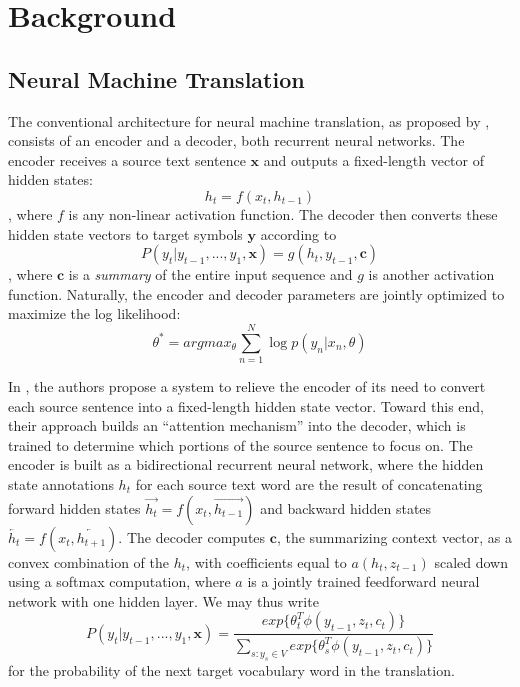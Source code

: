 \section{Background}
\label{sec:background}

\subsection{Neural Machine Translation}
The conventional architecture for neural machine translation, as proposed by ,
consists of an encoder and a decoder, both recurrent neural networks. The encoder receives
a source text sentence $\mathbf{x}$ and outputs a fixed-length vector of hidden states:
\begin{equation}
h_{t} = f(x_{t}, h_{t-1})
\end{equation},
where $f$ is any non-linear activation function. The decoder then converts these hidden state vectors to
target symbols $\mathbf{y}$ according to
\begin{equation}
P(y_{t} | y_{t-1}, ..., y_{1}, \mathbf{x}) = g(h_{t}, y_{t-1}, \mathbf{c})
\end{equation},
where $\mathbf{c}$ is a \emph{summary} of the entire input sequence and $g$ is another activation function.
Naturally, the encoder and decoder parameters are jointly optimized to maximize the log likelihood:
\begin{equation}
\theta^{*} = argmax_{\theta} \sum_{n=1}^{N}\log p(y_{n} | x_{n}, \theta)
\end{equation}

In , the authors propose a system to relieve the encoder of its need
to convert each source sentence into a fixed-length hidden state vector. Toward this end, their approach builds an ``attention mechanism''
into the decoder, which is trained to determine which portions of the source sentence to focus on. The encoder
is built as a bidirectional recurrent neural network, where the hidden state annotations $h_{t}$ for each source text word
are the result of concatenating forward hidden states $\overrightarrow{h_{t}} = f(x_{t}, \overrightarrow{h_{t-1}})$ and backward hidden states
$\overleftarrow{h_{t}} = f(x_{t}, \overleftarrow{h_{t+1}})$. The decoder computes $\mathbf{c}$, the summarizing context vector,
as a convex combination of the $h_{t}$, with coefficients equal to $a(h_{t}, z_{t-1})$ scaled down using a softmax computation, where $a$ is a
jointly trained feedforward neural network with one hidden layer. We may thus write
\begin{equation}
P(y_{t} | y_{t-1}, ..., y_{1}, \mathbf{x}) = \dfrac{exp\{\theta_{t}^{T} \phi(y_{t-1}, z_{t}, c_{t})\}}{\displaystyle\sum_{s:y_{s} \in V} exp\{\theta_{s}^{T} \phi(y_{t-1}, z_{t}, c_{t})\}}
\end{equation}
for the probability of the next target vocabulary word in the translation.\\

